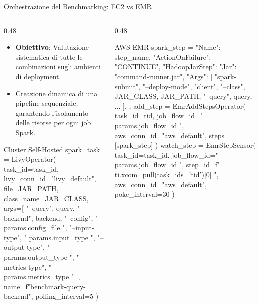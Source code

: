 \documentclass[10pt, aspectratio=169]{beamer}
\begin{document}
\begin{frame}[fragile]{Orchestrazione del Benchmarking: EC2 vs EMR}
    \begin{columns}[c]

        \begin{column}{0.48\textwidth}
            \begin{itemize}
                \item \textbf{Obiettivo}: Valutazione sistematica di tutte le combinazioni sugli ambienti di deployment.
                \item Creazione dinamica di una pipeline sequenziale, garantendo l'isolamento delle risorse per ogni job Spark.
            \end{itemize}


            \begin{pythoncodebox}{Cluster Self-Hosted}
spark_task = LivyOperator(
    task_id=task_id,
    livy_conn_id="livy_default",
    file=JAR_PATH,
    class_name=JAR_CLASS,
    args=[
        "--query", query,
        "--backend", backend,
        "--config", "{{ params.config_file }}",
        "--input-type", "{{ params.input_type }}",
        "--output-type", "{{ params.output_type }}",
        "--metrics-type", "{{ params.metrics_type }}"
    ],
    name=f"benchmark-{query}-{backend}",
    polling_interval=5
)
            \end{pythoncodebox}
        \end{column}

        \hfill

        \begin{column}{0.48\textwidth}
            \begin{pythoncodebox}{AWS EMR}
spark_step = {
    "Name": step_name,
    "ActionOnFailure": "CONTINUE",
    "HadoopJarStep": {
        "Jar": "command-runner.jar",
        "Args": [
            "spark-submit", "--deploy-mode", "client",
            "--class", JAR_CLASS, JAR_PATH,
            "--query", query, ...
        ],
    },
}
add_step = EmrAddStepsOperator(
    task_id=tid,
    job_flow_id="{{ params.job_flow_id }}",
    aws_conn_id="aws_default",
    steps=[spark_step]
)
watch_step = EmrStepSensor(
    task_id=task_id,
    job_flow_id="{{ params.job_flow_id }}",
    step_id=f"{{{{ ti.xcom_pull(task_ids='{tid}')[0] }}}}",
    aws_conn_id="aws_default",
    poke_interval=30
)
            \end{pythoncodebox}
        \end{column}
    \end{columns}
\end{frame}
\end{document}
